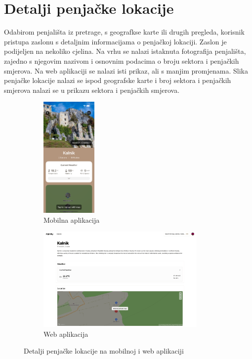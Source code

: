 \section{Detalji penjačke lokacije}

Odabirom penjališta iz pretrage, s geografkse karte ili drugih pregleda, korisnik pristupa zaslonu s detaljnim informacijama o penjačkoj lokaciji. Zaslon je podijeljen na nekoliko cjelina. Na vrhu se nalazi istaknuta fotografija penjališta, zajedno s njegovim nazivom i osnovnim podacima o broju sektora i penjačkih smjerova. Na web aplikaciji se nalazi isti prikaz, ali s manjim promjenama. Slika penjačke lokacije nalazi se ispod geografske karte i broj sektora i penjačkih smjerova nalazi se u prikazu sektora i penjačkih smjerova.

\begin{figure}[H]
    \centering
    \begin{subfigure}[b]{\textwidth}
        \centering
        \includegraphics[width=0.3\textwidth]{images/implementacija/crag-details/crag-details-top.png}
        \caption{Mobilna aplikacija}
        \label{fig:detalji_penjalista_mob}
    \end{subfigure}
    \hfill
    \begin{subfigure}[b]{\textwidth}
        \centering
        \includegraphics[width=0.9\textwidth]{images/implementacija/web/crag-details/crag-details-top.png}
        \caption{Web aplikacija}
        \label{fig:detalji_penjalista_web}
    \end{subfigure}
    \caption{Detalji penjačke lokacije na mobilnoj i web aplikaciji}
    \label{fig:detalji_penjališta_1}
\end{figure}

